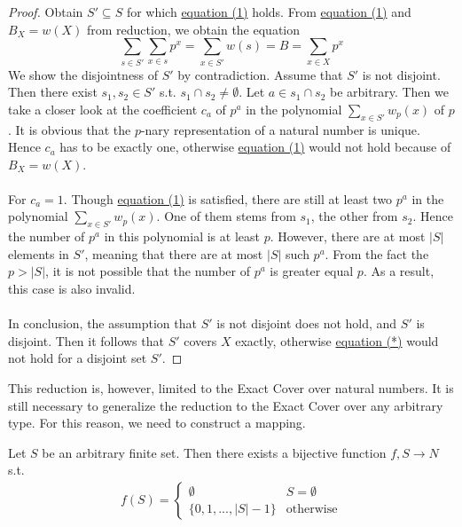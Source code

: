 \begin{proof}
    \label{lemma:sscompl}
Obtain $S' \subseteq S$ for which \hyperref[eq:1]{equation (1)} holds. 
From \hyperref[eq:1]{equation (1)} and  $B_X = w(X)$ from reduction, we obtain the equation 
\begin{equation}
    \sum_{s \in S'} \sum_{x \in s} p^x = \sum_{x \in S'} w(s) = B =  \sum_{x \in X} p^x \tag{*} \label{eq:proof}
\end{equation}
We show the disjointness of $S'$ by contradiction. 
Assume that $S'$ is not disjoint. Then there exist $s_1, s_2 \in S'$ s.t. $s_1 \cap s_2 \not= \emptyset$. Let $a \in s_1 \cap s_2$ be arbitrary. 
Then we take a closer look at the coefficient $c_a$ of $p^a$ in the polynomial $\sum_{x \in S'} w_p(x)$ of $p$. 
It is obvious that the $p$-nary representation of a natural number is unique. 
Hence $c_a$ has to be exactly one, otherwise \hyperref[eq:1]{equation (1)} would not hold because of $B_X = w(X)$. \\\\ 
For $c_a = 1$. Though \hyperref[eq:1]{equation (1)} is satisfied, there are still at least two $p^a$ in the polynomial $\sum_{x \in S'} w_p(x)$.
One of them stems from $s_1$, the other from $s_2$.
Hence the number of $p^a$ in this polynomial is at least $p$. However, there are at most $|S|$ elements in $S'$, meaning that there are at most $|S|$ such $p^a$. From the 
fact the $p > |S|$, it is not possible that the number of $p^a$ is greater equal $p$. As a result, this case is also invalid. \\\\
In conclusion, the assumption that $S'$ is not disjoint does not hold, and $S'$ is disjoint. 
Then it follows that $S'$ covers $X$ exactly, otherwise \hyperref[eq:proof]{equation (*)} would not hold for a disjoint set $S'$.

\end{proof}
This reduction is, however, limited to the Exact Cover over natural numbers. It is still necessary to generalize the reduction to the Exact Cover over any arbitrary type. 
For this reason, we need to construct a mapping.
\begin{lemma}
    \label{lemma:9}
    Let $S$ be an arbitrary finite set. Then there exists a bijective function $f, S \rightarrow N$ s.t. 
    \begin{align*}
        f(S) = \begin{cases}
            \emptyset & S = \emptyset \\ 
            \{0, 1, ..., |S| - 1\} & \text{otherwise}
        \end{cases}
    \end{align*}
\end{lemma}
